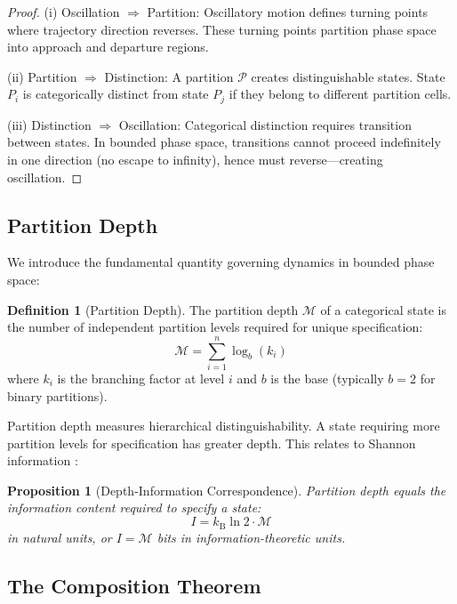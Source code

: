 \documentclass[twocolumn,10pt,a4paper]{article}
\newtheorem{proposition}[theorem]{Proposition}
\theoremstyle{definition}
\newtheorem{definition}[theorem]{Definition}
\theoremstyle{remark}
\newcommand{\kB}{k_{\mathrm{B}}}
\newcommand{\Depth}{\mathcal{M}}
\newcommand{\Partition}{\mathcal{P}}
\begin{document}
\begin{proof}
(i) Oscillation $\Rightarrow$ Partition: Oscillatory motion defines turning points where trajectory direction reverses. These turning points partition phase space into approach and departure regions.

(ii) Partition $\Rightarrow$ Distinction: A partition $\Partition$ creates distinguishable states. State $P_i$ is categorically distinct from state $P_j$ if they belong to different partition cells.

(iii) Distinction $\Rightarrow$ Oscillation: Categorical distinction requires transition between states. In bounded phase space, transitions cannot proceed indefinitely in one direction (no escape to infinity), hence must reverse---creating oscillation.
\end{proof}

\subsection{Partition Depth}

We introduce the fundamental quantity governing dynamics in bounded phase space:

\begin{definition}[Partition Depth]
\label{def:depth}
The partition depth $\Depth$ of a categorical state is the number of independent partition levels required for unique specification:
\begin{equation}
    \Depth = \sum_{i=1}^{n} \log_b(k_i)
\end{equation}
where $k_i$ is the branching factor at level $i$ and $b$ is the base (typically $b = 2$ for binary partitions).
\end{definition}

Partition depth measures hierarchical distinguishability. A state requiring more partition levels for specification has greater depth. This relates to Shannon information \cite{shannon1948}:

\begin{proposition}[Depth-Information Correspondence]
\label{prop:info}
Partition depth equals the information content required to specify a state:
\begin{equation}
    I = \kB \ln 2 \cdot \Depth
\end{equation}
in natural units, or $I = \Depth$ bits in information-theoretic units.
\end{proposition}

\subsection{The Composition Theorem}
\end{document}
